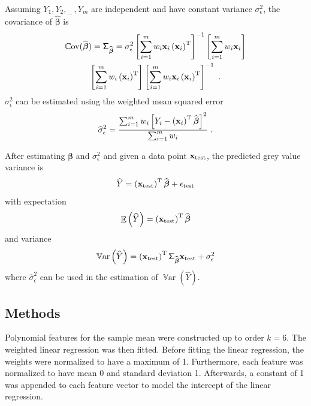 \documentclass[12pt]{report}
\DeclareMathOperator{\expectation}{\mathbb{E}}
\DeclareMathOperator{\variance}{\mathbb{V}ar}
\DeclareMathOperator{\cov}{\mathbb{C}ov}
\newcommand{\T}{^\textup{T}}
\newcommand{\dotdotdot}{_{\phantom{.}\cdots}}
\newcommand{\vect}[1]{\mathbf{#1}}
\newcommand{\vectGreek}[1]{\boldsymbol{#1}}
\newcommand{\matr}[1]{\mathsf{#1}}
\begin{document}
Assuming $Y_1,Y_2,\dotdotdot,Y_m$ are independent and have constant variance $\sigma_\epsilon^2$, the covariance of $\widehat{\vectGreek{\beta}}$ is
\begin{multline}
\cov(\widehat{\vectGreek{\beta}})=\matr{\Sigma}_{\widehat{\vectGreek{\beta}}}=
\sigma_\epsilon^2\left[\sum_{i=1}^mw_i\vect{x}_i\left(\vect{x}_i\right)\T\right]^{-1}\left[\sum_{i=1}^mw_i\vect{x}_i\right]
\\
\left[\sum_{i=1}^mw_i\left(\vect{x}_i\right)\T\right]\left[\sum_{i=1}^mw_i\vect{x}_i\left(\vect{x}_i\right)\T\right]^{-1} \ .
\end{multline}
$\sigma_\epsilon^2$ can be estimated using the weighted mean squared error
\begin{equation}
\widehat{\sigma}_\epsilon^2=\frac{\sum_{i=1}^mw_i\left[Y_i-\left(\vect{x}_i\right)\T\widehat{\vectGreek{\beta}}\right]^2}{\sum_{i=1}^mw_i} \ .
\end{equation}

After estimating $\vectGreek{\beta}$ and $\sigma_\epsilon^2$ and given a data point $\vect{x}_{\textup{test}}$, the predicted grey value variance is
\begin{equation}
\widehat{Y}=\left(\vect{x}_{\textup{test}}\right)\T\widehat{\vectGreek{\beta}} + \epsilon_{\textup{test}}
\end{equation}
with expectation
\begin{equation}
\expectation\left({\widehat{Y}}\right)=\left(\vect{x}_{\textup{test}}\right)\T\widehat{\vectGreek{\beta}}
\end{equation}
and variance
\begin{equation}
\variance\left(\widehat{Y}\right)=\left(\vect{x}_{\textup{test}}\right)\T\matr{\Sigma}_{\widehat{\vectGreek{\beta}}}\vect{x}_{\textup{test}}+\sigma_\epsilon^2
\end{equation}
where $\widehat{\sigma}_\epsilon^2$ can be used in the estimation of $\variance\left(\widehat{Y}\right)$.

\subsection{Methods}
Polynomial features for the sample mean were constructed up to order $k=6$. The weighted linear regression was then fitted. Before fitting the linear regression, the weights were normalized to have a maximum of 1. Furthermore, each feature was normalized to have mean 0 and standard deviation 1. Afterwards, a constant of 1 was appended to each feature vector to model the intercept of the linear regression.
\end{document}
